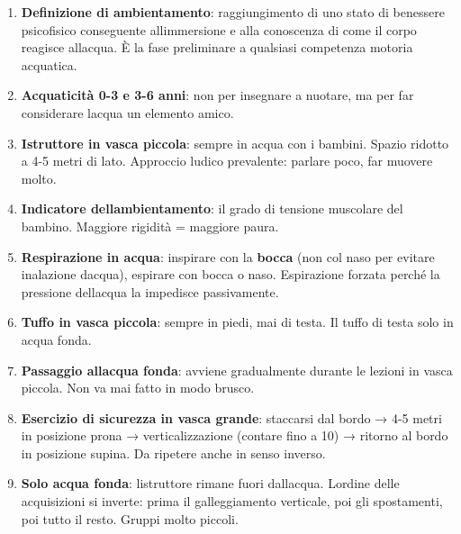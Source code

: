 \documentclass[a4paper,11pt]{article}
\begin{document}
\begin{enumerate}
      \item
            \textbf{Definizione di ambientamento}: raggiungimento di uno stato di
            benessere psicofisico conseguente all\textquotesingle immersione e
            alla conoscenza di come il corpo reagisce all\textquotesingle acqua. È
            la fase preliminare a qualsiasi competenza motoria acquatica.
      \item
            \textbf{Acquaticità 0-3 e 3-6 anni}: non per insegnare a nuotare, ma
            per far considerare l\textquotesingle acqua un elemento amico.
      \item
            \textbf{Istruttore in vasca piccola}: sempre in acqua con i bambini.
            Spazio ridotto a 4-5 metri di lato. Approccio ludico prevalente:
            parlare poco, far muovere molto.
      \item
            \textbf{Indicatore dell\textquotesingle ambientamento}: il grado di
            tensione muscolare del bambino. Maggiore rigidità = maggiore paura.
      \item
            \textbf{Respirazione in acqua}: inspirare con la \textbf{bocca} (non
            col naso per evitare inalazione d\textquotesingle acqua), espirare con
            bocca o naso. Espirazione forzata perché la pressione
            dell\textquotesingle acqua la impedisce passivamente.
      \item
            \textbf{Tuffo in vasca piccola}: sempre in piedi, mai di testa. Il
            tuffo di testa solo in acqua fonda.
      \item
            \textbf{Passaggio all\textquotesingle acqua fonda}: avviene
            gradualmente durante le lezioni in vasca piccola. Non va mai fatto in
            modo brusco.
      \item
            \textbf{Esercizio di sicurezza in vasca grande}: staccarsi dal bordo →
            4-5 metri in posizione prona → verticalizzazione (contare fino a 10) →
            ritorno al bordo in posizione supina. Da ripetere anche in senso
            inverso.
      \item
            \textbf{Solo acqua fonda}: l\textquotesingle istruttore rimane fuori
            dall\textquotesingle acqua. L\textquotesingle ordine delle
            acquisizioni si inverte: prima il galleggiamento verticale, poi gli
            spostamenti, poi tutto il resto. Gruppi molto piccoli.
\end{enumerate}
\end{document}
